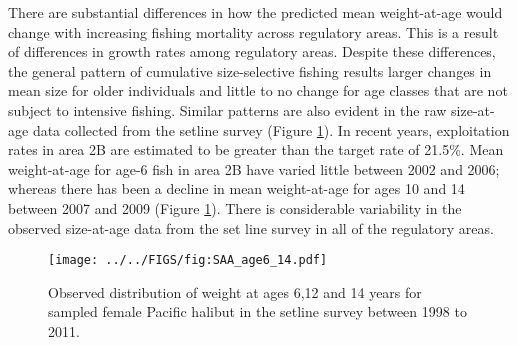 There are substantial differences in how the predicted mean weight-at-age would change with increasing fishing mortality across regulatory areas.  This is a result of differences in growth rates among regulatory areas.  Despite these differences, the general pattern of cumulative size-selective fishing results larger changes in mean size for older individuals and little to no change for age classes that are not subject to intensive fishing.  Similar patterns are also evident in the raw size-at-age data collected from the setline survey (Figure \ref{fig:FIGS_fig:SAA_age6_14}).  In recent years, exploitation rates in area 2B are estimated to be greater than the target rate of 21.5\%.  Mean weight-at-age for age-6 fish in area 2B have varied little between 2002 and 2006; whereas there has been a decline in mean weight-at-age for ages 10 and 14 between 2007 and 2009 (Figure \ref{fig:FIGS_fig:SAA_age6_14}).  There is considerable variability in the observed size-at-age data from the set line survey in all of the regulatory areas.

\begin{figure}[htbp]
	\centering
		\texttt{[image: ../../FIGS/fig:SAA\_age6\_14.pdf]}
	\caption{Observed distribution of weight at ages 6,12 and 14 years for sampled female Pacific halibut in the setline survey between 1998 to 2011.}
	\label{fig:FIGS_fig:SAA_age6_14}
\end{figure}






